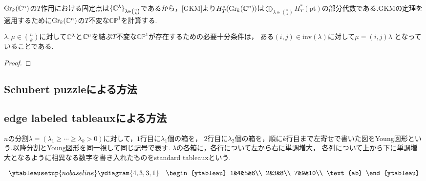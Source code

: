 $\text{Gr}_k(\mathbb{C}^n)$の$T$作用における固定点は$\{\mathbb{C}^\lambda\}_{\lambda\in\binom{n}{k}}$であるから，[GKM]より$H^*_T(\text{Gr}_k(\mathbb{C}^n))$は$\bigoplus_{\lambda\in\binom{n}{k}}H^*_T(\text{pt})$の部分代数である.GKMの定理を適用するために$\text{Gr}_k(\mathbb{C}^n)$の$T$不変な$\mathbb{CP}^1$を計算する.

\begin{prop}
  $\lambda,\mu\in\binom{n}{k}$に対して$\mathbb{C}^\lambda$と$\mathbb{C}^\mu$を結ぶ$T$不変な$\mathbb{CP}^1$が存在するための必要十分条件は， ある$(i, j)\in\text{inv}(\lambda)$に対して$\mu = (i, j)\lambda$
  となっていることである.
\end{prop}

\begin{proof}
  
\end{proof}






\subsection{Schubert puzzleによる方法}


\subsection{edge labeled tableauxによる方法}

\begin{defin}
  $n$の分割$\lambda=(\lambda_1\geq\cdots\geq\lambda_k>0)$に対して，$1$行目に$\lambda_1$個の箱を， $2$行目に$\lambda_2$個の箱を，順に$k$行目まで左寄せで書いた図をYoung図形という.以降分割とYoung図形を同一視して同じ記号で表す. $\lambda$の各箱に，各行について左から右に単調増大， 各列について上から下に単調増大となるように相異なる数字を書き入れたものをstandard tableauxという. 

\[
\ytableausetup{nobaseline}
\ydiagram{4, 3, 3, 1}
\quad\begin{ytableau}
    1&4&5&6\\
    2&3&8\\
    7&9&10\\
    \text{ab}
\end{ytableau}
\]

\end{defin}


